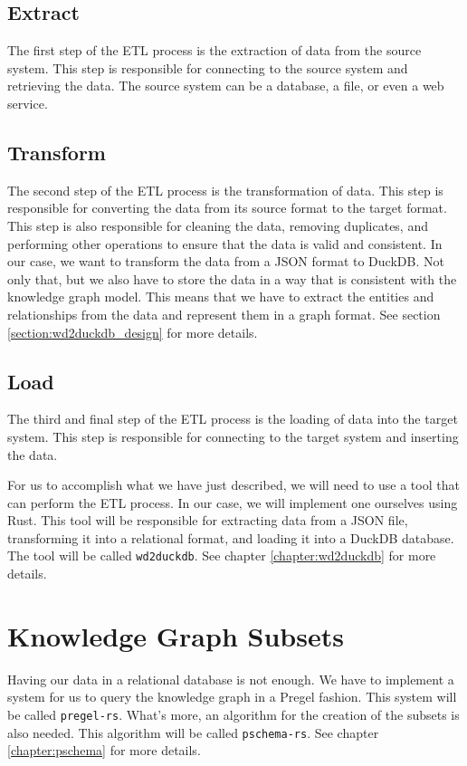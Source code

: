 \subsection{Extract}

The first step of the ETL process is the extraction of data from the source system. This step is responsible for connecting to the source system and retrieving the data. The source system can be a database, a file, or even a web service.

\subsection{Transform}

The second step of the ETL process is the transformation of data. This step is responsible for converting the data from its source format to the target format. This step is also responsible for cleaning the data, removing duplicates, and performing other operations to ensure that the data is valid and consistent. In our case, we want to transform the data from a JSON format to DuckDB. Not only that, but we also have to store the data in a way that is consistent with the knowledge graph model. This means that we have to extract the entities and relationships from the data and represent them in a graph format. See section \ref{section:wd2duckdb_design} for more details.

\subsection{Load}

The third and final step of the ETL process is the loading of data into the target system. This step is responsible for connecting to the target system and inserting the data.

For us to accomplish what we have just described, we will need to use a tool that can perform the ETL process. In our case, we will implement one ourselves using Rust. This tool will be responsible for extracting data from a JSON file, transforming it into a relational format, and loading it into a DuckDB database. The tool will be called \texttt{wd2duckdb}. See chapter \ref{chapter:wd2duckdb} for more details.

\section{Knowledge Graph Subsets}

Having our data in a relational database is not enough. We have to implement a system for us to query the knowledge graph in a Pregel fashion. This system will be called \texttt{pregel-rs}. What's more, an algorithm for the creation of the subsets is also needed. This algorithm will be called \texttt{pschema-rs}. See chapter \ref{chapter:pschema} for more details.